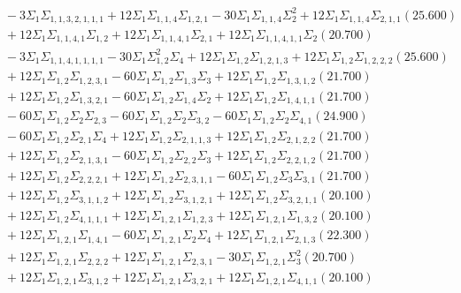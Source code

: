 \documentclass[12pt]{article}
\begin{document}
\begin{landscape}
\begin{align*}
		&\quad\quad -3\Sigma_{1}\Sigma_{1,1,3,2,1,1,1}+12\Sigma_{1}\Sigma_{1,1,4}\Sigma_{1,2,1}-30\Sigma_{1}\Sigma_{1,1,4}\Sigma_{2}^{2}+12\Sigma_{1}\Sigma_{1,1,4}\Sigma_{2,1,1}(25.600) \\ 
		&\quad\quad +12\Sigma_{1}\Sigma_{1,1,4,1}\Sigma_{1,2}+12\Sigma_{1}\Sigma_{1,1,4,1}\Sigma_{2,1}+12\Sigma_{1}\Sigma_{1,1,4,1,1}\Sigma_{2}(20.700) \\ 
		&\quad\quad -3\Sigma_{1}\Sigma_{1,1,4,1,1,1,1}-30\Sigma_{1}\Sigma_{1,2}^{2}\Sigma_{4}+12\Sigma_{1}\Sigma_{1,2}\Sigma_{1,2,1,3}+12\Sigma_{1}\Sigma_{1,2}\Sigma_{1,2,2,2}(25.600) \\ 
		&\quad\quad +12\Sigma_{1}\Sigma_{1,2}\Sigma_{1,2,3,1}-60\Sigma_{1}\Sigma_{1,2}\Sigma_{1,3}\Sigma_{3}+12\Sigma_{1}\Sigma_{1,2}\Sigma_{1,3,1,2}(21.700) \\ 
		&\quad\quad +12\Sigma_{1}\Sigma_{1,2}\Sigma_{1,3,2,1}-60\Sigma_{1}\Sigma_{1,2}\Sigma_{1,4}\Sigma_{2}+12\Sigma_{1}\Sigma_{1,2}\Sigma_{1,4,1,1}(21.700) \\ 
		&\quad\quad -60\Sigma_{1}\Sigma_{1,2}\Sigma_{2}\Sigma_{2,3}-60\Sigma_{1}\Sigma_{1,2}\Sigma_{2}\Sigma_{3,2}-60\Sigma_{1}\Sigma_{1,2}\Sigma_{2}\Sigma_{4,1}(24.900) \\ 
		&\quad\quad -60\Sigma_{1}\Sigma_{1,2}\Sigma_{2,1}\Sigma_{4}+12\Sigma_{1}\Sigma_{1,2}\Sigma_{2,1,1,3}+12\Sigma_{1}\Sigma_{1,2}\Sigma_{2,1,2,2}(21.700) \\ 
		&\quad\quad +12\Sigma_{1}\Sigma_{1,2}\Sigma_{2,1,3,1}-60\Sigma_{1}\Sigma_{1,2}\Sigma_{2,2}\Sigma_{3}+12\Sigma_{1}\Sigma_{1,2}\Sigma_{2,2,1,2}(21.700) \\ 
		&\quad\quad +12\Sigma_{1}\Sigma_{1,2}\Sigma_{2,2,2,1}+12\Sigma_{1}\Sigma_{1,2}\Sigma_{2,3,1,1}-60\Sigma_{1}\Sigma_{1,2}\Sigma_{3}\Sigma_{3,1}(21.700) \\ 
		&\quad\quad +12\Sigma_{1}\Sigma_{1,2}\Sigma_{3,1,1,2}+12\Sigma_{1}\Sigma_{1,2}\Sigma_{3,1,2,1}+12\Sigma_{1}\Sigma_{1,2}\Sigma_{3,2,1,1}(20.100) \\ 
		&\quad\quad +12\Sigma_{1}\Sigma_{1,2}\Sigma_{4,1,1,1}+12\Sigma_{1}\Sigma_{1,2,1}\Sigma_{1,2,3}+12\Sigma_{1}\Sigma_{1,2,1}\Sigma_{1,3,2}(20.100) \\ 
		&\quad\quad +12\Sigma_{1}\Sigma_{1,2,1}\Sigma_{1,4,1}-60\Sigma_{1}\Sigma_{1,2,1}\Sigma_{2}\Sigma_{4}+12\Sigma_{1}\Sigma_{1,2,1}\Sigma_{2,1,3}(22.300) \\ 
		&\quad\quad +12\Sigma_{1}\Sigma_{1,2,1}\Sigma_{2,2,2}+12\Sigma_{1}\Sigma_{1,2,1}\Sigma_{2,3,1}-30\Sigma_{1}\Sigma_{1,2,1}\Sigma_{3}^{2}(20.700) \\ 
		&\quad\quad +12\Sigma_{1}\Sigma_{1,2,1}\Sigma_{3,1,2}+12\Sigma_{1}\Sigma_{1,2,1}\Sigma_{3,2,1}+12\Sigma_{1}\Sigma_{1,2,1}\Sigma_{4,1,1}(20.100) \\ 

\end{align*}
\end{landscape}
\end{document}
